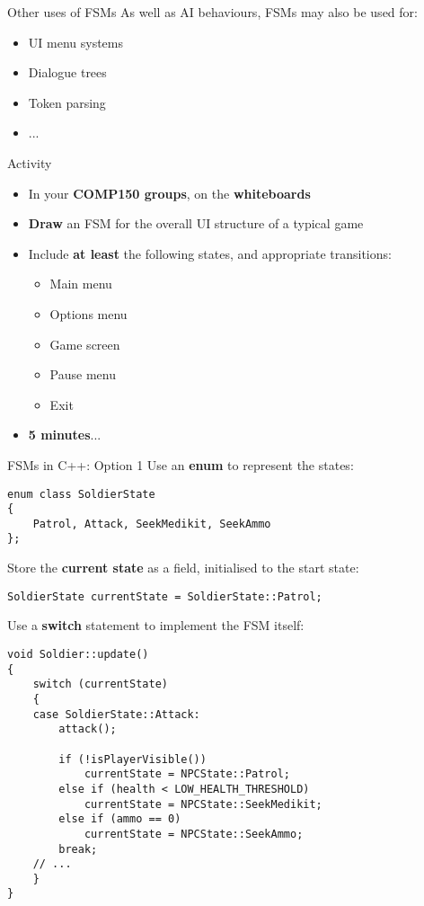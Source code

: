 \begin{frame}{Other uses of FSMs}
    As well as AI behaviours, FSMs may also be used for: \pause
    \begin{itemize}
        \item UI menu systems \pause
        \item Dialogue trees \pause
        \item Token parsing \pause
        \item ...
    \end{itemize}
\end{frame}

\begin{frame}{Activity}
    \begin{itemize}
        \item In your \textbf{COMP150 groups}, on the \textbf{whiteboards}
        \item \textbf{Draw} an FSM for the overall UI structure of a typical game
        \item Include \textbf{at least} the following states, and appropriate transitions:
            \begin{itemize}
                \item Main menu
                \item Options menu
                \item Game screen
                \item Pause menu
                \item Exit
            \end{itemize}
        \item \textbf{5 minutes}...
    \end{itemize}
\end{frame}

\begin{frame}[fragile]{FSMs in C++: Option 1}
    Use an \textbf{enum} to represent the states:
    \begin{lstlisting}
enum class SoldierState
{
    Patrol, Attack, SeekMedikit, SeekAmmo
};
    \end{lstlisting} \pause
    Store the \textbf{current state} as a field, initialised to the start state:
    \begin{lstlisting}
SoldierState currentState = SoldierState::Patrol;
    \end{lstlisting}
\end{frame}

\begin{frame}[fragile]
    Use a \textbf{switch} statement to implement the FSM itself:
    \begin{lstlisting}
void Soldier::update()
{
    switch (currentState)
    {
    case SoldierState::Attack:
        attack();
        
        if (!isPlayerVisible())
            currentState = NPCState::Patrol;
        else if (health < LOW_HEALTH_THRESHOLD)
            currentState = NPCState::SeekMedikit;
        else if (ammo == 0)
            currentState = NPCState::SeekAmmo;
        break;
    // ...
    }    
}
    \end{lstlisting}
\end{frame}

